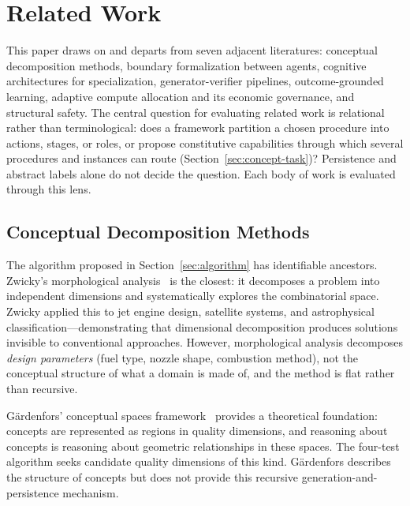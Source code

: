 \documentclass[11pt]{article}
\begin{document}
\section{Related Work}
\label{sec:related}

This paper draws on and departs from seven adjacent literatures: conceptual decomposition methods, boundary formalization between agents, cognitive architectures for specialization, generator-verifier pipelines, outcome-grounded learning, adaptive compute allocation and its economic governance, and structural safety. The central question for evaluating related work is relational rather than terminological: does a framework partition a chosen procedure into actions, stages, or roles, or propose constitutive capabilities through which several procedures and instances can route (Section~\ref{sec:concept-task})? Persistence and abstract labels alone do not decide the question. Each body of work is evaluated through this lens.

\subsection{Conceptual Decomposition Methods}

The algorithm proposed in Section~\ref{sec:algorithm} has identifiable ancestors. Zwicky's morphological analysis~\cite{zwicky1969} is the closest: it decomposes a problem into independent dimensions and systematically explores the combinatorial space. Zwicky applied this to jet engine design, satellite systems, and astrophysical classification---demonstrating that dimensional decomposition produces solutions invisible to conventional approaches. However, morphological analysis decomposes \emph{design parameters} (fuel type, nozzle shape, combustion method), not the conceptual structure of what a domain is made of, and the method is flat rather than recursive.

G\"ardenfors' conceptual spaces framework~\cite{gardenfors2000} provides a theoretical foundation: concepts are represented as regions in quality dimensions, and reasoning about concepts is reasoning about geometric relationships in these spaces. The four-test algorithm seeks candidate quality dimensions of this kind. G\"ardenfors describes the structure of concepts but does not provide this recursive generation-and-persistence mechanism.
\end{document}
